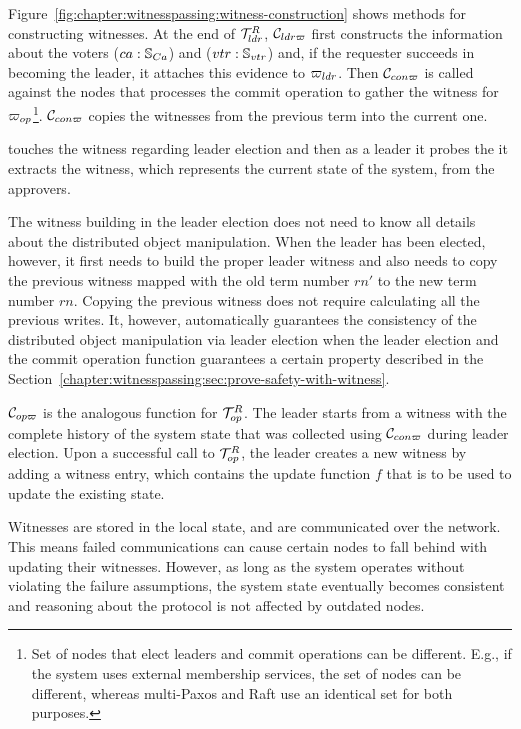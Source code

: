 Figure~\ref{fig:chapter:witnesspassing:witness-construction} shows methods for constructing witnesses.
At the end of $\mathcal{T}^{R}_{ldr}$, $\mathcal{C}_{ldr\varpi}$ first constructs the information about the
voters ($ca:\mathbb{S}_{Ca}$) and ($vtr:\mathbb{S}_{vtr}$) and, if the requester succeeds in becoming the leader,
it attaches this evidence to ${\varpi_{ldr}}$. Then $\mathcal{C}_{con\varpi}$ is called against
the nodes that processes the commit operation to gather the witness for
${\varpi_{op}}$\footnote{Set of nodes that elect leaders and commit operations
can be different. E.g., if the system uses external membership services,
the set of nodes can be different, whereas multi-Paxos and Raft use an identical
set for both purposes.}.
$\mathcal{C}_{con\varpi}$ copies the witnesses from the previous term into the current one.

touches the witness regarding leader election and then as a leader it probes the 
it extracts the witness, which represents the current state of the system, from 
the approvers.

The witness building in the leader election does not need to know 
all details about the distributed object manipulation.
When the leader has been elected, however, it first needs to build the proper leader witness and 
also needs to copy the previous witness mapped with the old term number $rn'$ to
 the new term number $rn$. 
 Copying the previous witness does not require calculating all the previous writes. 
 It, however, automatically guarantees the consistency of the distributed object manipulation 
 via leader election when the leader election and the commit operation function guarantees a 
 certain property described in the Section~\ref{chapter:witnesspassing:sec:prove-safety-with-witness}. 

$\mathcal{C}_{op\varpi}$ is the analogous function for $\mathcal{T}^{R}_{op}$.
The leader starts from a witness with the complete history of the system state
that was collected using $\mathcal{C}_{con\varpi}$ during leader election.
Upon a successful call to $\mathcal{T}^{R}_{op}$, the leader creates a new witness by
adding a witness entry, which contains the update function $f$ that is to be used
to update the existing state.

Witnesses are stored in the local state, and are communicated over the network.
This means failed communications can
cause certain nodes to fall behind with updating their witnesses.
However, as long as the system operates without violating the failure 
assumptions, the system state eventually becomes consistent and reasoning 
about the protocol is not affected by outdated nodes.

